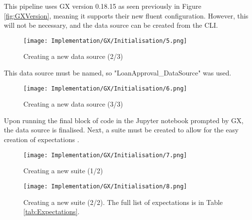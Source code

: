\para This pipeline uses GX version 0.18.15 as seen previously in Figure \ref{fig:GXVersion},
meaning it supports their new fluent configuration. However, this will not be necessary,
and the data source can be created from the CLI.

\begin{figure}[H]
    \centering
    \texttt{[image: Implementation/GX/Initialisation/5.png]}
    \caption{Creating a new data source (2/3)}
    \label{fig:GXDatasource2}
\end{figure}

\para This data source must be named, so "LoanApproval\_DataSource" was used.

\begin{figure}[H]
    \centering
    \texttt{[image: Implementation/GX/Initialisation/6.png]}
    \caption{Creating a new data source (3/3)}
    \label{fig:GXDatasource3}
\end{figure}

\para Upon running the final block of code in the Jupyter notebook prompted by 
GX, the data source is finalised. Next, a suite must be created to allow for the easy creation of expectations \autocite{gx_expectation_nodate}.

\begin{figure}[H]
    \centering
    \texttt{[image: Implementation/GX/Initialisation/7.png]}
    \caption{Creating a new suite (1/2)}
    \label{fig:GXSuite1}
\end{figure}

\begin{figure}[H]
    \centering
    \texttt{[image: Implementation/GX/Initialisation/8.png]}
    \caption{Creating a new suite (2/2). The full list of expectations is in Table \ref{tab:Expectations}.}
    \label{fig:GXSuite2}
\end{figure}

